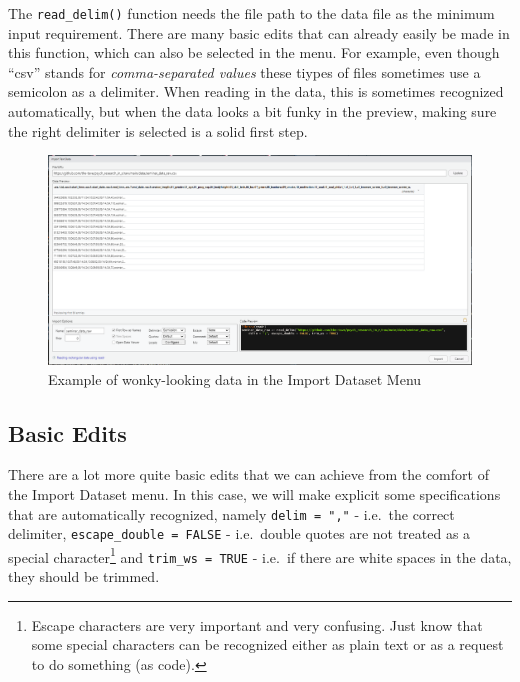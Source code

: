 \documentclass[
]{book}
\begin{document}
The \texttt{read\_delim()} function needs the file path to the data file as the minimum input requirement.
There are many basic edits that can already easily be made in this function, which can also be selected in the menu.
For example, even though ``csv'' stands for \emph{comma-separated values} these tiypes of files sometimes use a semicolon as a delimiter.
When reading in the data, this is sometimes recognized automatically, but when the data looks a bit funky in the preview, making sure the right delimiter is selected is a solid first step.

\begin{figure}
\centering
\includegraphics{./img/importcsv.png}
\caption{Example of wonky-looking data in the Import Dataset Menu}
\end{figure}

\subsection*{\texorpdfstring{Basic Edits }{Basic Edits }}\label{basic-edits}

There are a lot more quite basic edits that we can achieve from the comfort of the Import Dataset menu.
In this case, we will make explicit some specifications that are automatically recognized, namely \texttt{delim\ =\ ","} - i.e.~the correct delimiter, \texttt{escape\_double\ =\ FALSE} - i.e.~double quotes are not treated as a special character\footnote{Escape characters are very important and very confusing. Just know that some special characters can be recognized either as plain text or as a request to do something (as code).} and \texttt{trim\_ws\ =\ TRUE} - i.e.~if there are white spaces in the data, they should be trimmed.
\end{document}
